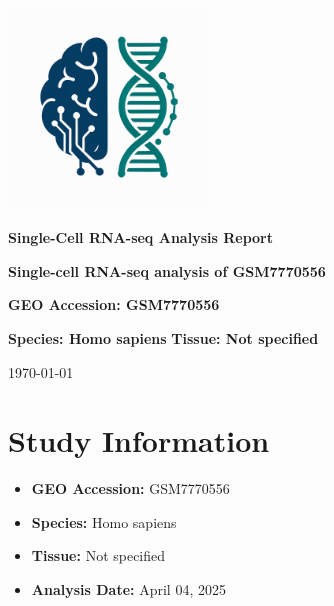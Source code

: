 \documentclass[12pt]{article}
\begin{document}
\begin{titlepage}
    \centering
    \vspace*{2cm}

    \includegraphics[width=0.4\textwidth]{scagentic_logo.png}
    \vspace{1cm}

    \Huge\textbf{Single-Cell RNA-seq Analysis Report}
    \vspace{1cm}

    \Large\textbf{Single-cell RNA-seq analysis of GSM7770556}
    \vspace{0.5cm}

    \Large\textbf{GEO Accession: GSM7770556}
    \vspace{0.5cm}

    \Large\textbf{Species: Homo sapiens}
    \vspace{0.5cm}
    \Large\textbf{Tissue: Not specified}
    \vspace{1cm}

    \large\today
\end{titlepage}

\tableofcontents
\newpage

\section{Study Information}
\begin{itemize}
    \item \textbf{GEO Accession:} GSM7770556
    \item \textbf{Species:} Homo sapiens
    \item \textbf{Tissue:} Not specified
    \item \textbf{Analysis Date:} April 04, 2025
\end{itemize}

\end{document}
